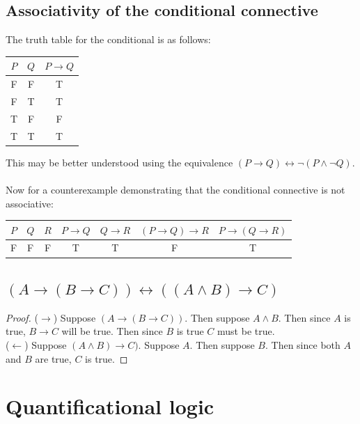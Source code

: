 \documentclass{report}
\theoremstyle{definition}
\begin{document}
\subsection{Associativity of the conditional connective}
The truth table for the conditional is as follows:
\begin{center}
\begin{tabular}{ccc}
$P$&$Q$&$P\to Q$\\
\hline
F&F&T\\
F&T&T\\
T&F&F\\
T&T&T
\end{tabular}
\end{center}
This may be better understood using the equivalence $(P\to Q)\leftrightarrow\neg(P\land\neg Q)$.\\
\vspace{1mm}\\
Now for a counterexample demonstrating that the conditional connective is not associative:
\begin{center}
\begin{tabular}{ccc|cc|cc}
$P$&$Q$&$R$&$P\to Q$&$Q\to R$&$(P\to Q)\to R$&$P\to(Q\to R)$\\
\hline
F&F&F&T&T&F&T
\end{tabular}
\end{center}

\subsection{$(A\to (B\to C))\leftrightarrow((A\land B)\to C)$}
\begin{proof}
($\rightarrow$) Suppose $(A\to (B\to C))$. Then suppose $A\land B$. Then since $A$ is true, $B\to C$ will be true. Then since $B$ is true $C$ must be true.\\
\indent($\leftarrow$) Suppose $(A\land B)\to C)$. Suppose $A$. Then suppose $B$. Then since both $A$ and $B$ are true, $C$ is true.
\end{proof}
\newpage

\section{Quantificational logic}
\end{document}
